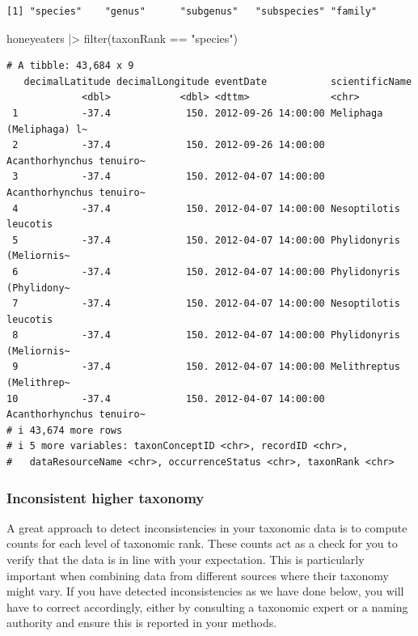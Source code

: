 \documentclass[
  letterpaper,
  DIV=11,
  numbers=noendperiod,
  oneside]{scrreprt}
\newenvironment{Shaded}{\begin{snugshade}}{\end{snugshade}}
\newcommand{\FunctionTok}[1]{\textcolor[rgb]{0.28,0.35,0.67}{#1}}
\newcommand{\NormalTok}[1]{\textcolor[rgb]{0.00,0.23,0.31}{#1}}
\newcommand{\SpecialCharTok}[1]{\textcolor[rgb]{0.37,0.37,0.37}{#1}}
\newcommand{\StringTok}[1]{\textcolor[rgb]{0.13,0.47,0.30}{#1}}
\begin{document}
\begin{verbatim}
[1] "species"    "genus"      "subgenus"   "subspecies" "family"    
\end{verbatim}

\begin{Shaded}
\begin{Highlighting}[]
\NormalTok{honeyeaters }\SpecialCharTok{|\textgreater{}} \FunctionTok{filter}\NormalTok{(taxonRank }\SpecialCharTok{==} \StringTok{"species"}\NormalTok{)}
\end{Highlighting}
\end{Shaded}

\begin{verbatim}
# A tibble: 43,684 x 9
   decimalLatitude decimalLongitude eventDate           scientificName          
             <dbl>            <dbl> <dttm>              <chr>                   
 1           -37.4             150. 2012-09-26 14:00:00 Meliphaga (Meliphaga) l~
 2           -37.4             150. 2012-09-26 14:00:00 Acanthorhynchus tenuiro~
 3           -37.4             150. 2012-04-07 14:00:00 Acanthorhynchus tenuiro~
 4           -37.4             150. 2012-04-07 14:00:00 Nesoptilotis leucotis   
 5           -37.4             150. 2012-04-07 14:00:00 Phylidonyris (Meliornis~
 6           -37.4             150. 2012-04-07 14:00:00 Phylidonyris (Phylidony~
 7           -37.4             150. 2012-04-07 14:00:00 Nesoptilotis leucotis   
 8           -37.4             150. 2012-04-07 14:00:00 Phylidonyris (Meliornis~
 9           -37.4             150. 2012-04-07 14:00:00 Melithreptus (Melithrep~
10           -37.4             150. 2012-04-07 14:00:00 Acanthorhynchus tenuiro~
# i 43,674 more rows
# i 5 more variables: taxonConceptID <chr>, recordID <chr>,
#   dataResourceName <chr>, occurrenceStatus <chr>, taxonRank <chr>
\end{verbatim}

\hypertarget{inconsistent-higher-taxonomy}{%
\subsubsection*{Inconsistent higher
taxonomy}\label{inconsistent-higher-taxonomy}}

A great approach to detect inconsistencies in your taxonomic data is to
compute counts for each level of taxonomic rank. These counts act as a
check for you to verify that the data is in line with your expectation.
This is particularly important when combining data from different
sources where their taxonomy might vary. If you have detected
inconsistencies as we have done below, you will have to correct
accordingly, either by consulting a taxonomic expert or a naming
authority and ensure this is reported in your methods.
\end{document}
